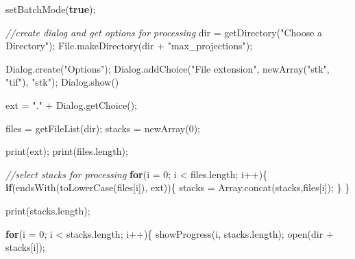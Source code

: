 \documentclass[
  12pt,
  a4paper,
]{book}
\newenvironment{Shaded}{}{}
\newcommand{\CommentTok}[1]{\textcolor[rgb]{0.38,0.63,0.69}{\textit{#1}}}
\newcommand{\ControlFlowTok}[1]{\textcolor[rgb]{0.00,0.44,0.13}{\textbf{#1}}}
\newcommand{\DecValTok}[1]{\textcolor[rgb]{0.25,0.63,0.44}{#1}}
\newcommand{\KeywordTok}[1]{\textcolor[rgb]{0.00,0.44,0.13}{\textbf{#1}}}
\newcommand{\NormalTok}[1]{#1}
\newcommand{\OperatorTok}[1]{\textcolor[rgb]{0.40,0.40,0.40}{#1}}
\newcommand{\StringTok}[1]{\textcolor[rgb]{0.25,0.44,0.63}{#1}}
\begin{document}
\begin{Shaded}
\begin{Highlighting}[]
\NormalTok{setBatchMode}\OperatorTok{(}\KeywordTok{true}\OperatorTok{);}

\CommentTok{//create dialog and get options for processing}
\NormalTok{dir }\OperatorTok{=}\NormalTok{ getDirectory}\OperatorTok{(}\StringTok{"Choose a Directory"}\OperatorTok{);}
\NormalTok{File}\OperatorTok{.}\NormalTok{makeDirectory}\OperatorTok{(}\NormalTok{dir }\OperatorTok{+} \StringTok{"max\_projections"}\OperatorTok{);}

\NormalTok{Dialog}\OperatorTok{.}\NormalTok{create}\OperatorTok{(}\StringTok{"Options"}\OperatorTok{);}
\NormalTok{Dialog}\OperatorTok{.}\NormalTok{addChoice}\OperatorTok{(}\StringTok{"File extension"}\OperatorTok{,}\NormalTok{ newArray}\OperatorTok{(}\StringTok{"stk"}\OperatorTok{,} \StringTok{"tif"}\OperatorTok{),} \StringTok{"stk"}\OperatorTok{);}
\NormalTok{Dialog}\OperatorTok{.}\NormalTok{show}\OperatorTok{()}

\NormalTok{ext }\OperatorTok{=} \StringTok{"."} \OperatorTok{+}\NormalTok{ Dialog}\OperatorTok{.}\NormalTok{getChoice}\OperatorTok{();}

\NormalTok{files }\OperatorTok{=}\NormalTok{ getFileList}\OperatorTok{(}\NormalTok{dir}\OperatorTok{);}
\NormalTok{stacks }\OperatorTok{=}\NormalTok{ newArray}\OperatorTok{(}\DecValTok{0}\OperatorTok{);}

\NormalTok{print}\OperatorTok{(}\NormalTok{ext}\OperatorTok{);}
\NormalTok{print}\OperatorTok{(}\NormalTok{files}\OperatorTok{.}\NormalTok{length}\OperatorTok{);}

\CommentTok{//select stacks for processing}
\ControlFlowTok{for}\OperatorTok{(}\NormalTok{i }\OperatorTok{=} \DecValTok{0}\OperatorTok{;}\NormalTok{ i }\OperatorTok{\textless{}}\NormalTok{ files}\OperatorTok{.}\NormalTok{length}\OperatorTok{;}\NormalTok{ i}\OperatorTok{++)\{}
    \ControlFlowTok{if}\OperatorTok{(}\NormalTok{endsWith}\OperatorTok{(}\NormalTok{toLowerCase}\OperatorTok{(}\NormalTok{files}\OperatorTok{[}\NormalTok{i}\OperatorTok{]),}\NormalTok{ ext}\OperatorTok{))\{}
\NormalTok{        stacks }\OperatorTok{=}\NormalTok{ Array}\OperatorTok{.}\NormalTok{concat}\OperatorTok{(}\NormalTok{stacks}\OperatorTok{,}\NormalTok{files}\OperatorTok{[}\NormalTok{i}\OperatorTok{]);}
    \OperatorTok{\}}
\OperatorTok{\}}

\NormalTok{print}\OperatorTok{(}\NormalTok{stacks}\OperatorTok{.}\NormalTok{length}\OperatorTok{);}

\ControlFlowTok{for}\OperatorTok{(}\NormalTok{i }\OperatorTok{=} \DecValTok{0}\OperatorTok{;}\NormalTok{ i }\OperatorTok{\textless{}}\NormalTok{ stacks}\OperatorTok{.}\NormalTok{length}\OperatorTok{;}\NormalTok{ i}\OperatorTok{++)\{}
\NormalTok{    showProgress}\OperatorTok{(}\NormalTok{i}\OperatorTok{,}\NormalTok{ stacks}\OperatorTok{.}\NormalTok{length}\OperatorTok{);}
\NormalTok{    open}\OperatorTok{(}\NormalTok{dir }\OperatorTok{+}\NormalTok{ stacks}\OperatorTok{[}\NormalTok{i}\OperatorTok{]);}


\end{Highlighting}
\end{Shaded}
\end{document}
